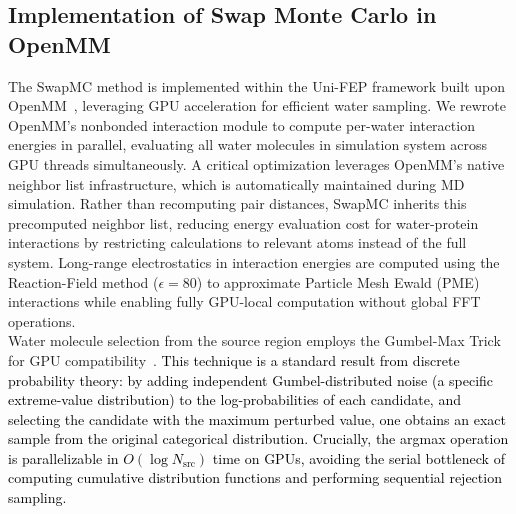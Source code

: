 \documentclass[journal=jacsat,manuscript=article]{achemso}
\newcommand*{\textblue}[1]{\textcolor{black}{#1}}
\begin{document}
\subsection{Implementation of Swap Monte Carlo in OpenMM}
The SwapMC method is implemented within the Uni-FEP framework built upon OpenMM~\cite{Eastman2023}, 
leveraging GPU acceleration for efficient water sampling. 
We rewrote OpenMM's nonbonded interaction module to compute per-water interaction energies in parallel, 
evaluating all water molecules in simulation system across GPU threads simultaneously. 
A critical optimization leverages OpenMM's native neighbor list infrastructure, which is automatically maintained during MD simulation. 
Rather than recomputing pair distances, SwapMC inherits this precomputed neighbor list, reducing energy evaluation cost for water-protein interactions by restricting calculations to relevant atoms instead of the full system. 
Long-range electrostatics in interaction energies are computed using the Reaction-Field method ($\epsilon = 80$) to approximate Particle Mesh Ewald (PME)~\cite{petersen1995accuracy} interactions while enabling fully GPU-local computation without global FFT operations. \\
\newline 
Water molecule selection from the source region employs the Gumbel-Max Trick for GPU compatibility~\cite{gumbel1954statistical,huijben2022review}.
\textblue{
This technique is a standard result from discrete probability theory: 
by adding independent Gumbel-distributed noise (a specific extreme-value distribution) to the log-probabilities of each candidate, 
and selecting the candidate with the maximum perturbed value,
one obtains an exact sample from the original categorical distribution.
Crucially, the argmax operation is parallelizable in $O(\log N_{\text{src}})$ time on GPUs, 
avoiding the serial bottleneck of computing cumulative distribution functions and performing sequential rejection sampling.
}
\newline
\end{document}
